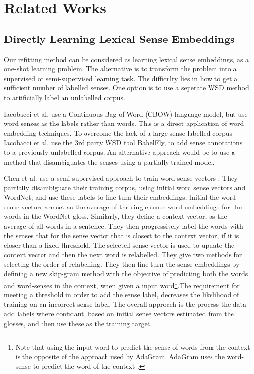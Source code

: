 \documentclass{sig-alternate}
\begin{document}
\section{Related Works} \label{relatedwords}

\subsection{Directly Learning Lexical Sense Embeddings}
Our refitting method can be considered as learning lexical sense embeddings, as a one-shot learning problem. The alternative is to transform the problem into a supervised or semi-supervised learning task. The difficulty lies in how to get a sufficient number of labelled senses. One option is to use a seperate WSD method to artificially label an unlabelled corpus.

Iacobacci et al. \parencite{iacobacci2015sensembed} use a Continuous Bag of Word (CBOW) \parencite{mikolov2013efficient} language model, but use word senses as the labels rather than words. This is a direct application of word embedding techniques. To overcome the lack of a large sense labelled corpus, Iacobacci et al. use the 3rd party WSD tool BabelFly, to add sense annotations to a previously unlabelled corpus. An alternative approach would be to use a method that disambiguates the senses using a partially trained model.

Chen et al. use a semi-supervised approach to train word sense vectors \parencite{Chen2014}. They partially disambiguate their training corpus, using initial word sense vectors and WordNet; and use these labels to fine-turn their embeddings. 
Initial the word sense vectors are set as the average of the single sense word embeddings\parencite{mikolov2013efficient} for the words in the WordNet gloss.
Similarly, they define a context vector, as the average of all words in a sentence.
They then progressively label the words with the senses
that for the sense vector that is closest to the context vector, if it is closer than a fixed threshold.
The selected sense vector is used to update the context vector and then the next word is relabelled. They give two methods for selecting the order of relabelling.
They then fine turn the sense embeddings by defining a new skip-gram method with the objective of predicting both the words and word-senses in the context, when given a input word\footnote{Note that using the input word to predict the sense of words from the context is the opposite of the approach used by AdaGram. AdaGram uses the word-sense to predict the word of the context \parencite{AdaGrams}.}.The requirement for meeting a threshold in order to add the sense label,  decreases the likelihood of training on an incorrect sense label. The overall approach is the process the data add labels where confidant, based on initial sense vectors estimated from the glosses, and then use these as the training target.
\end{document}
